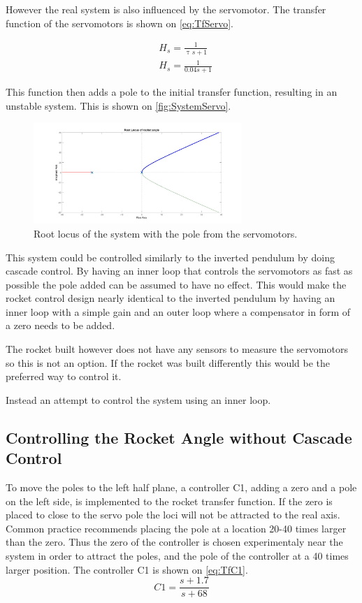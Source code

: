 However the real system is also influenced by the servomotor. The transfer function of the servomotors is shown on \autoref{eq:TfServo}. 

\begin{subequations}
	\begin{flalign}
& H_s = \frac{1}{\uptau s+ 1}	\\
& H_s = \frac{1}{0.04s + 1}
\label{eq:TfServo}
	\end{flalign}
\end{subequations}
\startexplain
{}
\stopexplain

This function then adds a pole to the initial transfer function, resulting in an unstable system. This is shown on \autoref{fig:SystemServo}.
\begin{figure}[htbp]
\centering
\includegraphics[width=0.7\textwidth]{figures/Rocket/design/tf_with_servo_vf}
\caption{Root locus of the system with the pole from the servomotors.}
\label{fig:SystemServo}
\end{figure}

This system could be controlled similarly to the inverted pendulum by doing cascade control. By having an inner loop that controls the servomotors as fast as possible the pole added can be assumed to have no effect. This would make the rocket control design nearly identical to the inverted pendulum by having an inner loop with a simple gain and an outer loop where a compensator in form of a zero needs to be added. 

The rocket built however does not have any sensors to measure the servomotors so this is not an option. If the rocket was built differently this would be the preferred way to control it.

Instead an attempt to control the system using an inner loop.

\subsection{Controlling the Rocket Angle without Cascade Control}
To move the poles to the left half plane, a controller C1, adding a zero and a pole on the left side, is implemented to the rocket transfer function. If the zero is placed to close to the servo pole the loci will not be attracted to the real axis. Common practice recommends placing the pole at a location 20-40 times larger than the zero. Thus the zero of the controller is chosen experimentaly near the system in order to attract the poles, and the pole of the controller at a 40 times larger position. The controller C1 is shown on \autoref{eq:TfC1}.
\begin{equation}
C1 = \frac{s + 1.7}{s + 68}	\label{eq:TfC1}
\end{equation}

